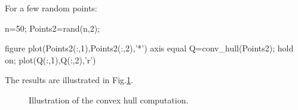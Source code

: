 For a few random points:
\begin{matlab}
n=50;
Points2=rand(n,2);

figure
plot(Points2(:,1),Points2(:,2),'*')
axis equal
Q=conv_hull(Points2);
hold on;
plot(Q(:,1),Q(:,2),'r')
\end{matlab}

The results are illustrated in Fig.\ref{fig:matlab:convexhull:res}.

\begin{figure}[htbp]
\centering

\hfill
{}

\caption{Illustration of the convex hull computation.}
\label{fig:matlab:convexhull:res}
\end{figure}


